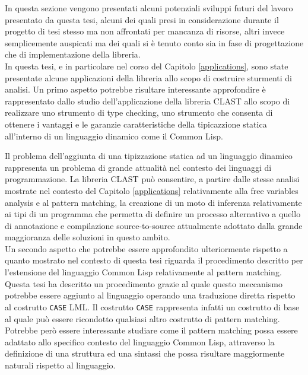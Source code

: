 \documentclass{book}
\begin{document}
In questa sezione vengono presentati alcuni potenziali sviluppi futuri del
lavoro presentato da questa tesi, alcuni dei quali presi in considerazione
durante il progetto di tesi stesso ma non affrontati per mancanza di risorse,
altri invece semplicemente auspicati ma dei quali si è tenuto conto sia in fase
di progettazione che di implementazione della libreria.\\

In questa tesi, e in particolare nel corso del Capitolo \ref{applications}, sono
state presentate alcune applicazioni della libreria allo scopo di costruire
sturmenti di analisi. Un primo aspetto potrebbe risultare interessante
approfondire è rappresentato dallo studio dell'applicazione della libreria CLAST
allo scopo di realizzare uno strumento di type checking, uno strumento che
consenta di ottenere i vantaggi e le garanzie caratteristiche della tipicazzione
statica all'interno di un linguaggio dinamico come il Common Lisp.

Il problema dell'aggiunta di una tipizzazione statica ad un linguaggio dinamico
rappresenta un problema di grande attualità nel contesto dei linguaggi di
programmazione. La libreria CLAST può consentire, a partire dalle stesse analisi
mostrate nel contesto del Capitolo \ref{applications} relativamente alla free
variables analysis e al pattern matching, la creazione di un moto di inferenza
relativamente ai tipi di un programma che permetta di definire un processo
alternativo a quello di annotazione e compilazione source-to-source attualmente
adottato dalla grande maggioranza delle soluzioni in questo ambito.\\

Un secondo aspetto che potrebbe essere approfondito ulteriormente rispetto a
quanto mostrato nel contesto di questa tesi riguarda il procedimento descritto
per l'estensione del linguaggio Common Lisp relativamente al pattern matching.
Questa tesi ha descritto un procedimento grazie al quale questo meccanismo
potrebbe essere aggiunto al linguaggio operando una traduzione diretta rispetto
al costrutto \texttt{CASE} LML. Il costrutto \texttt{CASE} rappresenta infatti
un costrutto di base al quale può essere ricondotto qualsiasi altro costrutto di
pattern matching. Potrebbe però essere interessante studiare come il pattern
matching possa essere adattato allo specifico contesto del linguaggio Common
Lisp, attraverso la definizione di una struttura ed una sintassi che possa
risultare maggiormente naturali rispetto al linguaggio.\\
\end{document}
